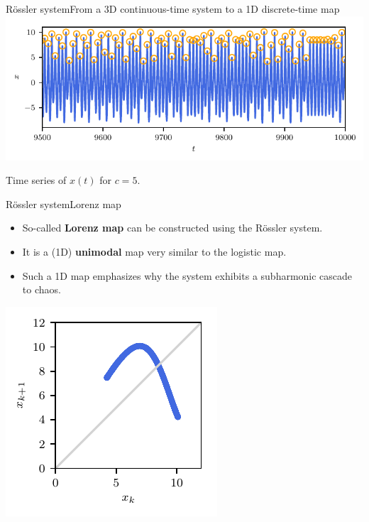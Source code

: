 \documentclass[usenames,dvipsnames,svgnames,10pt,aspectratio=169]{beamer}
\begin{document}
\begin{frame}[t, c]{R\"ossler system}{From a 3D continuous-time system to a 1D discrete-time map}
	\centering
	\includegraphics[width=.75\textwidth]{rossler_successive_maxima}

	Time series of $x(t)$ for $c=5$.

	\vspace{1cm}
\end{frame}

\begin{frame}[t, c]{R\"ossler system}{Lorenz map}
	\begin{minipage}{.48\textwidth}
		\begin{itemize}
			\item So-called \alert{\textbf{Lorenz map}} can be constructed using the R\"ossler system.

			\bigskip

			\item It is a (1D) \alert{\textbf{unimodal}} map very similar to the logistic map.

			\bigskip

			\item Such a 1D map emphasizes why the system exhibits a subharmonic cascade to chaos.
		\end{itemize}
	\end{minipage}%
	\hfill
	\begin{minipage}{.48\textwidth}
		\centering
		\includegraphics[width=.8\textwidth]{rossler_lorenz_map}
	\end{minipage}

	\vspace{1cm}
\end{frame}
\end{document}
